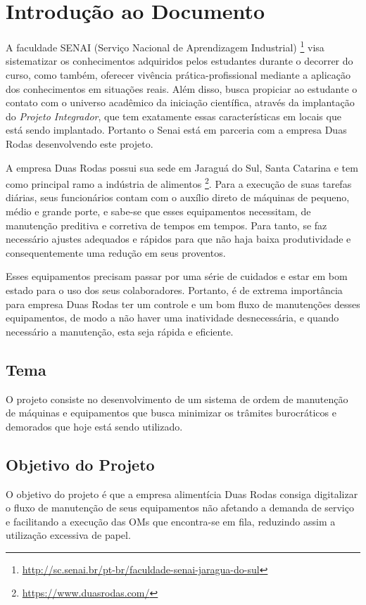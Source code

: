 \chapter{Introdução ao Documento}

{A faculdade SENAI (Serviço Nacional de Aprendizagem Industrial) \footnote{\url{http://sc.senai.br/pt-br/faculdade-senai-jaragua-do-sul}}  visa sistematizar os conhecimentos adquiridos pelos estudantes durante o decorrer do curso, como também, oferecer vivência  prática-profissional mediante a aplicação dos conhecimentos em situações reais. Além disso, busca  propiciar ao estudante o contato com o universo acadêmico da iniciação científica, através da implantação do \textit{Projeto Integrador}, que tem exatamente essas características em locais que está sendo implantado. Portanto o Senai está em parceria com a empresa Duas Rodas desenvolvendo este projeto. }



A empresa Duas Rodas possui sua sede em Jaraguá do Sul, Santa Catarina e tem como principal ramo a indústria de alimentos \footnote{\url{ https://www.duasrodas.com/}}. Para a execução de suas tarefas diárias, seus funcionários contam com o auxílio direto de máquinas de pequeno, médio e grande porte, e sabe-se que esses equipamentos necessitam, de manutenção preditiva e corretiva  de tempos em tempos. Para tanto, se faz necessário ajustes adequados e rápidos para que não haja baixa produtividade e consequentemente uma redução em seus proventos.

Esses equipamentos precisam passar por uma série de cuidados e estar em bom estado para o uso dos seus colaboradores. Portanto, é de extrema importância para empresa Duas Rodas ter um controle e um bom fluxo de manutenções desses equipamentos, de modo a não haver uma inatividade desnecessária, e quando necessário a manutenção, esta seja rápida e eficiente.

\section{Tema}
O projeto consiste no desenvolvimento de um sistema de ordem de manutenção de máquinas e equipamentos que busca minimizar os trâmites burocráticos e demorados que hoje está sendo utilizado.

\section{Objetivo do Projeto}
O objetivo do projeto é que a empresa alimentícia Duas Rodas consiga digitalizar
o fluxo de manutenção de seus equipamentos não afetando a demanda de serviço e facilitando a execução das OMs que encontra-se em fila, reduzindo assim a utilização excessiva de papel.

